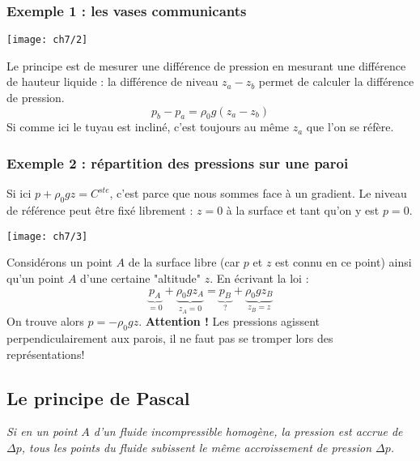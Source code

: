	    \subsubsection{Exemple 1 : les vases communicants}
        \begin{center}
        \texttt{[image: ch7/2]}
        \end{center}
		Le principe est de mesurer une différence de pression  en mesurant une 
		différence de hauteur liquide : la différence de niveau $z_a-z_b$ permet 
		de calculer la différence de pression.
		\begin{equation}
		p_b-p_a = \rho_0g(z_a-z_b)
		\end{equation}
		Si comme ici le tuyau est incliné, c'est toujours au même $z_a$ que l'on 
		se réfère.
		
		\subsubsection{Exemple 2 : répartition des pressions sur une paroi}
		Si ici $p+\rho_0gz = C^{ste}$, c'est parce que nous sommes face à un 
		gradient. Le niveau de référence peut être fixé librement : $z=0$ à la 
		surface et tant qu'on y est $p=0$.\\
\begin{center}
\texttt{[image: ch7/3]}
\end{center}
 		
		Considérons un point $A$ de la surface libre (car $p$ et $z$ est connu en ce
		point) ainsi qu'un point $A$ d'une certaine "altitude" $z$. En écrivant la loi :
		\begin{equation}
		\underbrace{p_A}_{=0} + \underbrace{\rho_0gz_A}_{z_A=0} = \underbrace{p_B}_{?} +
		\underbrace{\rho_0gz_B}_{z_B=z}
		\end{equation}				
		On trouve alors $p=-\rho_0gz$. \textbf{Attention !} Les pressions agissent 
		perpendiculairement aux parois, il ne faut pas se tromper lors des représentations!
				
		
    \subsection{Le principe de Pascal}
    \textit{Si en un point $A$ d'un fluide incompressible homogène, la pression est 
    accrue de $\Delta p$, tous les points du fluide subissent le même accroissement de 
    pression $\Delta p$.}   
